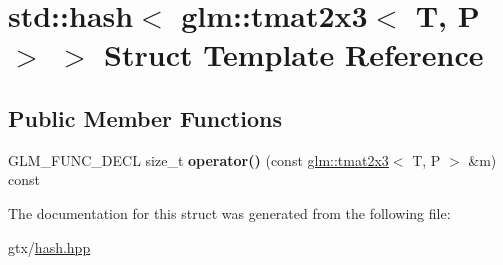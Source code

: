 \hypertarget{structstd_1_1hash_3_01glm_1_1tmat2x3_3_01T_00_01P_01_4_01_4}{\section{std\-:\-:hash$<$ glm\-:\-:tmat2x3$<$ T, P $>$ $>$ Struct Template Reference}
\label{structstd_1_1hash_3_01glm_1_1tmat2x3_3_01T_00_01P_01_4_01_4}
}
\subsection*{Public Member Functions}
\begin{DoxyCompactItemize}
\item 
\hypertarget{structstd_1_1hash_3_01glm_1_1tmat2x3_3_01T_00_01P_01_4_01_4_ad330396713392efb2505cfa62a4f430d}{G\-L\-M\-\_\-\-F\-U\-N\-C\-\_\-\-D\-E\-C\-L size\-\_\-t {\bfseries operator()} (const \hyperlink{structglm_1_1tmat2x3}{glm\-::tmat2x3}$<$ T, P $>$ \&m) const }\label{structstd_1_1hash_3_01glm_1_1tmat2x3_3_01T_00_01P_01_4_01_4_ad330396713392efb2505cfa62a4f430d}

\end{DoxyCompactItemize}


The documentation for this struct was generated from the following file\-:\begin{DoxyCompactItemize}
\item 
gtx/\hyperlink{hash_8hpp}{hash.\-hpp}\end{DoxyCompactItemize}

